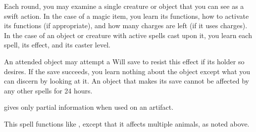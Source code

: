 \spellrng{\rngclose}
\begin{spelleffect}
  Each round, you may examine a single creature or object that you can see as a swift action. In the case of a magic item, you learn its functions, how to activate its functions (if appropriate), and how many charges are left (if it uses charges). In the case of an object or creature with active spells cast upon it, you learn each spell, its effect, and its caster level.
  \par An attended object may attempt a Will save to resist this effect if its holder so desires. If the save succeeds, you learn nothing about the object except what you can discern by looking at it. An object that makes its save cannot be affected by any other  spells for 24 hours.
\end{spelleffect}
\begin{spellnotes}
   gives only partial information when used on an artifact.
\end{spellnotes}

\spellrng{\rngmed}
\begin{spelleffect}
  This spell functions like , except that it affects multiple animals, as noted above.
\end{spelleffect}

